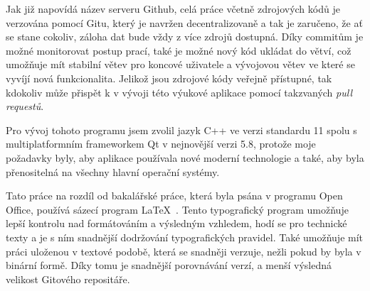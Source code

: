 Jak již napovídá název serveru Github, celá práce včetně zdrojových kódů je verzována pomocí Gitu, který je navržen decentralizovaně a tak je zaručeno, že ať se stane cokoliv, záloha dat bude vždy z více zdrojů dostupná. Díky commitům je možné monitorovat postup prací, také je možné nový kód ukládat do větví, což umožňuje mít stabilní větev pro koncové uživatele a vývojovou větev ve které se vyvíjí nová funkcionalita. Jelikož jsou zdrojové kódy veřejně přístupné, tak kdokoliv může přispět k v vývoji této výukové aplikace pomocí takzvaných \textit{pull requestů}.

Pro vývoj tohoto programu jsem zvolil jazyk C++ ve verzi standardu 11 spolu s multiplatformním frameworkem Qt v nejnovější verzi 5.8, protože moje požadavky byly, aby aplikace používala nové moderní technologie a také, aby byla přenositelná na všechny hlavní operační systémy.

Tato práce na rozdíl od bakalářské práce, která byla psána v programu Open Office, používá sázecí program \LaTeX\ \cite{latex}. Tento typografický program umožňuje lepší kontrolu nad formátováním a výsledným vzhledem, hodí se pro technické texty a je s ním snadnější dodržování typografických pravidel. Také umožňuje mít práci uloženou v textové podobě, která se snadněji verzuje, nežli pokud by byla v binární formě. Díky tomu je snadnější porovnávání verzí, a menší výsledná velikost Gitového repositáře.




